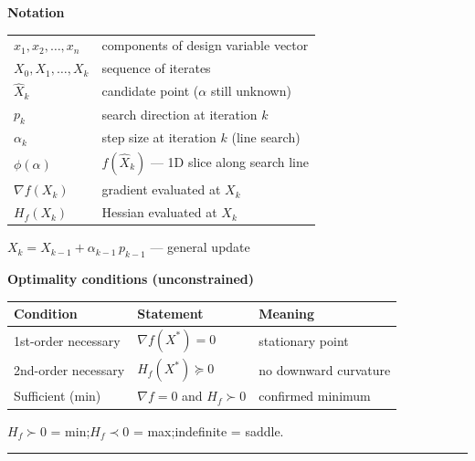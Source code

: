 \documentclass[10pt]{article}
\begin{document}
\noindent
\begin{minipage}[t]{0.49\textwidth}\vspace{0pt}
  \textbf{Notation}

  \begin{tabular}{@{}ll@{}}
    $x_1, x_2, \ldots, x_n$ & components of design variable vector \\
    $X_0, X_1, \ldots, X_k$ & sequence of iterates \\
    $\hat{X}_k$              & candidate point ($\alpha$ still unknown) \\
    $p_k$                    & search direction at iteration $k$ \\
    $\alpha_k$               & step size at iteration $k$ (line search) \\
    $\phi(\alpha)$           & $f(\hat{X}_k)$ — 1D slice along search line \\
    $\nabla f(X_k)$          & gradient evaluated at $X_k$ \\
    $H_f(X_k)$               & Hessian evaluated at $X_k$ \\
  \end{tabular}

  $X_k = X_{k-1} + \alpha_{k-1}\,p_{k-1}$ \quad — general update
\end{minipage}\hfill
\begin{minipage}[t]{0.49\textwidth}\vspace{0pt}
  \textbf{Optimality conditions (unconstrained)}

  \begin{tabular}{@{}lll@{}}
    \toprule
    Condition & Statement & Meaning \\
    \midrule
    1st-order necessary & $\nabla f(X^*)=0$ & stationary point \\
    2nd-order necessary & $H_f(X^*)\succeq0$ & no downward curvature \\
    Sufficient (min)    & $\nabla f=0$ and $H_f\succ0$ & confirmed minimum \\
    \bottomrule
  \end{tabular}

  \smallskip
  $H_f\succ0$ = min;\quad $H_f\prec0$ = max;\quad indefinite = saddle.
\end{minipage}

\vspace{3pt}\hrule\vspace{3pt}
\end{document}

